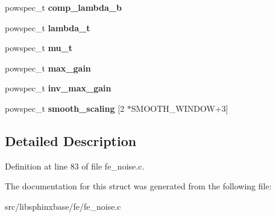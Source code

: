 \begin{DoxyCompactItemize}
powspec\+\_\+t {\bfseries comp\+\_\+lambda\+\_\+b}
\item 
\mbox{\label{structnoise__stats__s_a94d5961c9df8d3345821c2f6c4358514}} 
powspec\+\_\+t {\bfseries lambda\+\_\+t}
\item 
\mbox{\label{structnoise__stats__s_ad5cc76a830669ea5fbf0b8f4e4f80652}} 
powspec\+\_\+t {\bfseries mu\+\_\+t}
\item 
\mbox{\label{structnoise__stats__s_afeda1bf01ce753f6b3e4fb89279cfc63}} 
powspec\+\_\+t {\bfseries max\+\_\+gain}
\item 
\mbox{\label{structnoise__stats__s_ab6b62f1324e05bafa461bdcab8bc1bf3}} 
powspec\+\_\+t {\bfseries inv\+\_\+max\+\_\+gain}
\item 
\mbox{\label{structnoise__stats__s_a4bc8cd91479f20703fdf82251ba90e6e}} 
powspec\+\_\+t {\bfseries smooth\+\_\+scaling} [2 $\ast$S\+M\+O\+O\+T\+H\+\_\+\+W\+I\+N\+D\+OW+3]
\end{DoxyCompactItemize}


\subsection{Detailed Description}


Definition at line 83 of file fe\+\_\+noise.\+c.



The documentation for this struct was generated from the following file\+:\begin{DoxyCompactItemize}
\item 
src/libsphinxbase/fe/fe\+\_\+noise.\+c\end{DoxyCompactItemize}
